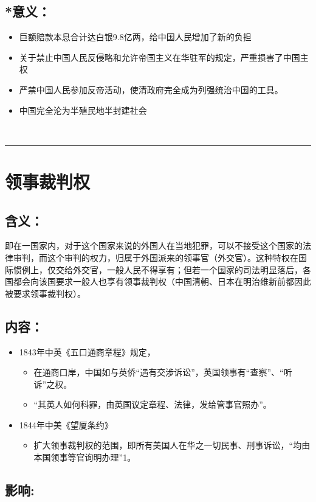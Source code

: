 \documentclass{article}
\begin{document}
\subsection*{*意义：}
\begin{itemize}
    \item 巨额赔款本息合计达白银9.8亿两，给中国人民增加了新的负担
    \item 关于禁止中国人民反侵略和允许帝国主义在华驻军的规定，严重损害了中国主权
    \item 严禁中国人民参加反帝活动，使清政府完全成为列强统治中国的工具。
    \item 中国完全沦为半殖民地半封建社会
\end{itemize}


\ \hrule

\section*{领事裁判权}
\subsection*{含义：}
\noindent 即在一国家内，对于这个国家来说的外国人在当地犯罪，可以不接受这个国家的法律审判，而这个审判的权力，归属于外国派来的领事官（外交官）。这种特权在国际惯例上，仅交给外交官，一般人民不得享有；但若一个国家的司法明显落后，各国都会向该国要求一般人也享有领事裁判权（中国清朝、日本在明治维新前都因此被要求领事裁判权）。
\subsection*{内容：}
\begin{itemize}
    \item 1843年中英《五口通商章程》规定，
    \begin{itemize}
        \item 在通商口岸，中国如与英侨“遇有交涉诉讼”，英国领事有“查察”、“听诉”之权。
        \item “其英人如何科罪，由英国议定章程、法律，发给管事官照办”。
    \end{itemize}
    \item 1844年中美《望厦条约》
    \begin{itemize}
        \item 扩大领事裁判权的范围，即所有美国人在华之一切民事、刑事诉讼，“均由本国领事等官询明办理”1。
    \end{itemize}
\end{itemize}
\subsection*{影响:}
\end{document}
